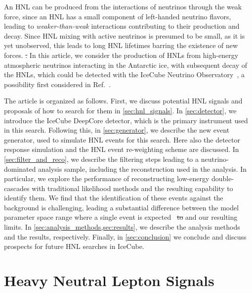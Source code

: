 \documentclass[
    aps,
    prd,
    reprint,
    amsmath,
    amssymb,
    nofootinbib,
    superscriptaddress,
    floatfix
]{revtex4-2}
\providecommand{\DIFaddtex}[1]{{\protect\color{blue}\uwave{#1}}} %
\providecommand{\DIFdeltex}[1]{{\protect\color{red}\sout{#1}}}                      %
\providecommand{\DIFaddbegin}{} %
\providecommand{\DIFaddend}{} %
\providecommand{\DIFdelbegin}{} %
\providecommand{\DIFdelend}{} %
\providecommand{\DIFadd}[1]{\texorpdfstring{\DIFaddtex{#1}}{#1}} %
\providecommand{\DIFdel}[1]{\texorpdfstring{\DIFdeltex{#1}}{}} %
\newcommand{\DIFscaledelfig}{0.5}
\newlength{\DIFdelgraphicswidth} %
\newlength{\DIFdelgraphicsheight} %
\newcommand{\DIFaddincludegraphics}[2][]{{\color{blue}\fbox{\DIFOincludegraphics[#1]{#2}}}} %
\newcommand{\DIFdelincludegraphics}[2][]{%
\sbox{\DIFdelgraphicsbox}{\DIFOincludegraphics[#1]{#2}}%
\settoboxwidth{\DIFdelgraphicswidth}{\DIFdelgraphicsbox} %
\settoboxtotalheight{\DIFdelgraphicsheight}{\DIFdelgraphicsbox} %
\scalebox{\DIFscaledelfig}{%
\parbox[b]{\DIFdelgraphicswidth}{\usebox{\DIFdelgraphicsbox}\\[-\baselineskip] \rule{\DIFdelgraphicswidth}{0em}}\llap{\resizebox{\DIFdelgraphicswidth}{\DIFdelgraphicsheight}{%
\setlength{\unitlength}{\DIFdelgraphicswidth}%
\begin{picture}(1,1)%
\thicklines\linethickness{2pt} %
{\color[rgb]{1,0,0}\put(0,0){\framebox(1,1){}}}%
{\color[rgb]{1,0,0}\put(0,0){\line( 1,1){1}}}%
{\color[rgb]{1,0,0}\put(0,1){\line(1,-1){1}}}%
\end{picture}%
}\hspace*{3pt}}} %
} %
\DeclareRobustCommand{\DIFaddbegin}{\DIFOaddbegin \let\includegraphics\DIFaddincludegraphics} %
\DeclareRobustCommand{\DIFaddend}{\DIFOaddend \let\includegraphics\DIFOincludegraphics} %
\DeclareRobustCommand{\DIFdelbegin}{\DIFOdelbegin \let\includegraphics\DIFdelincludegraphics} %
\DeclareRobustCommand{\DIFdelend}{\DIFOaddend \let\includegraphics\DIFOincludegraphics} %
\begin{document}
An HNL can be produced from the interactions of neutrinos through the weak force, since an HNL has a small component of left-handed neutrino flavors, leading to \textit{weaker-than-weak} interactions contributing to their production and decay.
Since HNL mixing with active neutrinos is presumed to be small, as it is yet unobserved, this leads to long HNL lifetimes barring the existence of new forces.
\DIFdelbegin \DIFdel{.
}\DIFdelend In this article, we consider the production of HNLs from high-energy atmospheric neutrinos interacting in the Antarctic ice, with subsequent decay of the HNLs, which could be detected with the IceCube Neutrino Observatory~\cite{IceCube:2016zyt}, a possibility first considered in Ref.~\cite{Coloma:2017ppo}.

The article is organized as follows.
First, we discuss potential HNL signals and proposals of how to search for them in \cref{sec:hnl_signals}.
In \cref{sec:detector}, we introduce the IceCube DeepCore detector, which is the primary instrument used in this search.
Following this, in \cref{sec:generator}, we describe the new event generator, used to simulate HNL events for this search.
Here also the detector response simulation and the HNL event re-weighting scheme are discussed.
In \cref{sec:filter_and_reco}, we describe the filtering steps leading to a neutrino-dominated analysis sample, including the reconstruction used in the analysis.
In particular, we explore the performance of reconstructing low-energy double-cascades with traditional likelihood methods and the resulting capability to identify them.
We find that the identification of these events against the background is challenging, leading \DIFaddbegin \DIFadd{to }\DIFaddend a substantial difference between the model parameter space range where a single event is expected~\cite{Coloma:2017ppo, Boiarska:2021yho} \DIFdelbegin \DIFdel{to }\DIFdelend and our resulting limits.
In \cref{sec:analysis_methods,sec:results}, we describe the analysis methods and the results, respectively. 
Finally, in \cref{sec:conclusion} we conclude and discuss prospects for future HNL searches in IceCube.




\section{\label{sec:hnl_signals}Heavy Neutral Lepton Signals}
\end{document}
